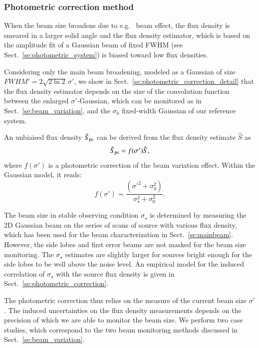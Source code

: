 \subsubsection{Photometric correction method}
\label{se:photometric_correction_method}

When the beam size broadens due to e.g. \afternoon\ beam effect, the
flux density is smeared in a larger solid angle and
the flux density estimator, which is based on the amplitude fit of a
Gaussian beam of fixed FWHM (see
Sect.~\ref{se:photometric_system}) is biased toward low flux
densities.

Considering only the main beam broadening, modeled as a Gaussian of
size $FWHM' = 2 \sqrt{2\ln{2}} \, \sigma '$, we show in
Sect.~\ref{se:photometric_correction_detail} that
the flux density estimator depends on the size of the convolution
function between the enlarged $\sigma '$-Gaussian, which can be
monitored as in Sect.~\ref{se:beam_variation}, and the 
$\sigma_0$ fixed-width Gaussian of our reference system.

An unbiaised
flux density $\hat{S}_{\rm{pc}}$ can be derived from the flux density
estimate $\hat{S}$ as
\begin{equation}
  \hat{S}_{\rm{pc}} = f(\sigma')\hat{S},
\end{equation}
where $f(\sigma')$ is a photometric correction of the beam variation
effect. Within the Gaussian model, it reads:
\begin{equation}
  f(\sigma') = \frac{(\sigma'^2 + \sigma_0^2)}{\sigma_{\star}^2 + \sigma_0^2}. 
\end{equation} 

The beam size in stable observing condition $\sigma_\star$ is
determined by measuring the 2D Gaussian beam on the series of scans of
source with various flux density, which has been used for the beam
characterization in Sect.~\ref{se:mainbeam}. However, the side lobes
and first error beams are not masked for the beam size
monitoring. The $\sigma_\star$ estimates are slightly
larger for sources bright enough for the side lobes to be well above
the noise level. An empirical model for the induced correlation of
$\sigma_\star$ with the source flux density is given in
Sect.~\ref{se:photometric_correction}.

The photometric correction thus relies on the measure of the current beam
size $\sigma'$. The induced uncertainties on the flux density
measurements depends on the precision of which we are able to monitor
the beam size. We perform two case studies, which correspond to the
two beam monitoring methods discussed in
Sect.~\ref{se:beam_variation}.\\


